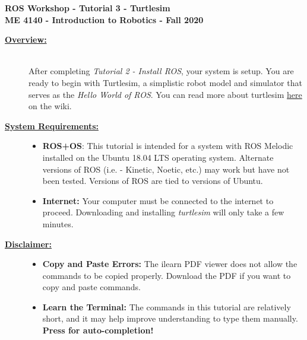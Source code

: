 \documentclass[12pt]{article}
\newcommand{\TAB}{\raisebox{-0.1em}{Tab}}
\newcommand{\TABKey}{\keystroke{\TAB}}
\newcommand{\R}{\color{red}}
\begin{document}

\begin{center}
   {\bf \Large ROS Workshop - Tutorial 3 - Turtlesim}\vspace{3mm} \\
   {\bf \large ME 4140 - Introduction to Robotics - Fall 2020} \vspace{5mm}\\
\end{center}

\begin{description}

\item[\textbf{\underline{Overview:}}] \hfill \vspace{3mm}\\
After completing {\it Tutorial 2 - Install ROS}, your system is setup. You are ready to begin with Turtlesim, a simplistic robot model and simulator that serves as the {\it Hello World of ROS}. You can read more about turtlesim \href{http://wiki.ros.org/turtlesim}{here} on the wiki. 

\item[\textbf{\underline{System Requirements:}}] \hfill \vspace{0mm}

\begin{itemize}
	\item {\bf ROS+OS}: This tutorial is intended for a system with ROS Melodic installed on the Ubuntu 18.04 LTS operating system. Alternate versions of ROS (i.e. - Kinetic, Noetic, etc.) may work but have not been tested. Versions of ROS are tied to versions of Ubuntu.
	\item {\bf Internet:} Your computer must be connected to the internet to proceed. Downloading and installing {\it turtlesim} will only take a few minutes.
\end{itemize}

\item[\textbf{\underline{Disclaimer:}}] \hfill \vspace{0mm}

\begin{itemize}
	\item {\bf\R Copy and Paste Errors:} {\R The ilearn PDF viewer does not allow the commands to be copied properly. Download the PDF if you want to copy and paste commands.} 
	
	\item {\bf Learn the Terminal:} The commands in this tutorial are relatively short, and it may help improve understanding to type them manually. {\bf Press \TABKey for auto-completion!}
	

\end{itemize}
\end{description}
\end{document}
